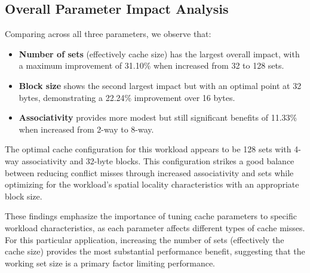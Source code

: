\documentclass[11pt]{article}
\begin{document}
\subsection{Overall Parameter Impact Analysis}
Comparing across all three parameters, we observe that:

\begin{itemize}
  \item \textbf{Number of sets} (effectively cache size) has the largest overall impact, with a maximum improvement of 31.10\% when increased from 32 to 128 sets.
  
  \item \textbf{Block size} shows the second largest impact but with an optimal point at 32 bytes, demonstrating a 22.24\% improvement over 16 bytes.
  
  \item \textbf{Associativity} provides more modest but still significant benefits of 11.33\% when increased from 2-way to 8-way.
\end{itemize}

The optimal cache configuration for this workload appears to be 128 sets with 4-way associativity and 32-byte blocks. This configuration strikes a good balance between reducing conflict misses through increased associativity and sets while optimizing for the workload's spatial locality characteristics with an appropriate block size.

These findings emphasize the importance of tuning cache parameters to specific workload characteristics, as each parameter affects different types of cache misses. For this particular application, increasing the number of sets (effectively the cache size) provides the most substantial performance benefit, suggesting that the working set size is a primary factor limiting performance.
\end{document}
